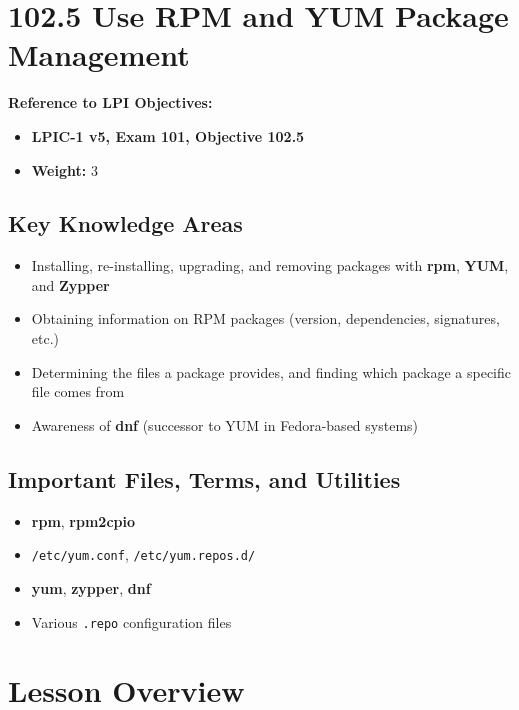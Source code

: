 \documentclass[a4paper]{report}
\begin{document}
\newpage

\section*{102.5 Use RPM and YUM Package Management}

\textbf{Reference to LPI Objectives:}
\begin{itemize}
    \item \textbf{LPIC-1 v5, Exam 101, Objective 102.5}
    \item \textbf{Weight:} 3
\end{itemize}

\subsection*{Key Knowledge Areas}
\begin{itemize}
    \item Installing, re-installing, upgrading, and removing packages with \textbf{rpm}, \textbf{YUM}, and \textbf{Zypper}
    \item Obtaining information on RPM packages (version, dependencies, signatures, etc.)
    \item Determining the files a package provides, and finding which package a specific file comes from
    \item Awareness of \textbf{dnf} (successor to YUM in Fedora-based systems)
\end{itemize}

\subsection*{Important Files, Terms, and Utilities}
\begin{itemize}
    \item \textbf{rpm}, \textbf{rpm2cpio}
    \item \texttt{/etc/yum.conf}, \texttt{/etc/yum.repos.d/}
    \item \textbf{yum}, \textbf{zypper}, \textbf{dnf}
    \item Various \texttt{.repo} configuration files
\end{itemize}

\section*{Lesson Overview}
\end{document}
